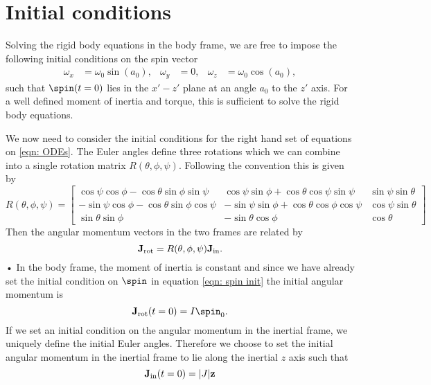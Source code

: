 \documentclass[/home/greg/Thesis/main/main.tex]{subfiles}
\begin{document}
\section{Initial conditions}

Solving the rigid body equations in the body frame, we are free to impose the
following initial conditions on the spin vector
\begin{align}\label{eqn: spin init}
\omega_{x} & = \omega_{0}\sin(a_{0}), & 
\omega_{y} & = 0, & 
\omega_{z} & = \omega_{0}\cos(a_{0}),
\end{align}
such that $\spin(t=0)$ lies in the $x' - z'$ plane at an angle $a_{0}$ to the
$z'$ axis. For a well defined moment of
inertia and torque, this is sufficient to solve the rigid body equations. 

We now need to consider the initial conditions for the right hand set of equations
on \eqref{eqn: ODEs}. The Euler angles  define three rotations which we can 
combine into a single rotation matrix $R(\theta, \phi, \psi)$. Following the
\citet{Landau1969} convention this is given by 
\begin{equation}
R(\theta, \phi, \psi) = \left[ 
\begin{array}{ccc}
\cos\psi \cos\phi - \cos\theta \sin\phi \sin \psi &
\cos\psi \sin \phi + \cos\theta \cos \psi \sin \psi &
\sin \psi \sin\theta \\
-\sin\psi \cos\phi - \cos\theta\sin\phi\cos\psi &
-\sin\psi\sin\phi + \cos\theta\cos\phi\cos\psi &
\cos\psi \sin\theta \\
\sin\theta\sin\phi & 
-\sin\theta \cos\phi & 
\cos\theta 
\end{array}
\right]
\label{eqn: rotation matrix}
\end{equation}
Then the 
angular momentum vectors in the two frames are related by 
\begin{equation}
\mathbf{J}_{\textrm{rot}} = R(\theta, \phi, \psi) \mathbf{J}_{\textrm{in}} .
\label{eqn: transform}
\end{equation}•
In the body frame, the moment of inertia is constant and since we have already set the 
initial condition on $\spin$  in equation \eqref{eqn: spin init} the initial angular momentum is 
\begin{equation}
  \Jr(t=0) = I \spin_0.
\end{equation}
If we set an initial condition on the angular momentum in the inertial frame,
we uniquely define the initial Euler angles. Therefore we choose to set the initial
angular momentum in the inertial frame to lie along the inertial $z$ axis such
that
\begin{equation}
  \mathbf{J}_{\textrm{in}}(t=0) = |J| \mathbf{z}
\end{equation}
\end{document}

